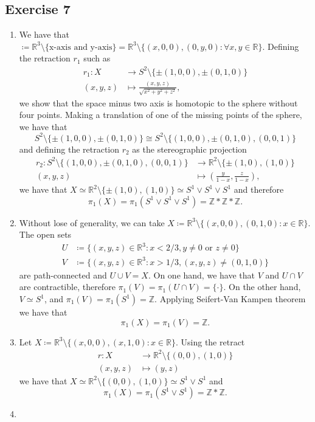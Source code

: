 \documentclass[11pt,a4paper]{article}
\newcommand{\R}{\mathbb R}
\newcommand{\Z}{\mathbb Z}
\begin{document}
\subsection*{Exercise 7}
\renewcommand{\theenumi}{\alph{enumi}} 
\begin{enumerate}
  \item We have that $  \coloneq \mathbb R^3 \setminus \{\text{x-axis and y-axis}\} = \mathbb R^3 \setminus \{(x, 0, 0), (0, y, 0) : \forall x, y \in \mathbb R\} $. Defining the retraction $ r_1 $ such as 
  \begin{align*}
    r_1 \colon X &\to S^2 \setminus \{\pm (1, 0, 0), \pm (0, 1, 0) \} \\
    (x, y, z) &\mapsto \frac{(x, y, z)}{\sqrt{x^2 + y^2 + z^2}},
  \end{align*}
  we show that the space minus two axis is homotopic to the sphere without four points. Making a translation of one of the missing points of the sphere, we have that
  $$
    S^2 \setminus \{\pm (1, 0, 0), \pm (0, 1, 0) \} \cong S^2 \setminus \{(1, 0, 0), \pm (0, 1, 0), (0, 0, 1) \}
  $$
  and defining the retraction $r_2$ as the stereographic projection
  \begin{align*}
    r_2 \colon S^2 \setminus \{(1, 0, 0), \pm (0, 1, 0), (0, 0, 1) \} &\to \mathbb R^2 \setminus \{\pm (1, 0), (1, 0) \} \\
    (x, y, z) &\mapsto \left(\frac{y}{1-x}, \frac{z}{1-x}\right),
  \end{align*}
  we have that
  $
    X \simeq \mathbb R^2 \setminus \{\pm (1, 0), (1, 0) \} \simeq S^1 \vee S^1 \vee S^1 
  $
  and therefore
  $$
    \pi_1 (X) = \pi_1(S^1 \vee S^1 \vee S^1) = \mathbb Z * \mathbb Z * \mathbb Z.
  $$
  
  \item Without lose of generality, we can take $ X \coloneq \R^3 \setminus \{(x, 0, 0), (0, 1, 0) : x \in \R \} $. The open sets 
  \begin{align*}
    U &\coloneq \{(x, y, z) \in \R^3 : x < 2/3, y \neq 0 \text{ or } z \neq 0\} \\
    V &\coloneq \{(x, y, z) \in \R^3 : x > 1/3, (x, y, z) \neq (0, 1, 0) \}
  \end{align*} 
  are path-connected and $ U \cup V = X $. On one hand, we have that $ V $ and $ U \cap V $ are contractible, therefore $ \pi_1(V) = \pi_1(U \cap V) = \{ \cdot \} $. On the other hand, $ V \simeq S^1 $, and $ \pi_1(V) = \pi_1(S^1) = \Z$. Applying Seifert-Van Kampen theorem we have that
  $$
    \pi_1(X) = \pi_1(V) = \Z.
  $$

  \item Let $ X \coloneq \R^3 \setminus \{(x, 0, 0), (x, 1, 0) : x \in \R\} $. Using the retract
  \begin{align*}
    r \colon X &\to \R^2 \setminus \{(0, 0), (1, 0)\} \\
    (x, y, z) &\mapsto (y, z)
  \end{align*}
  we have that $ X \simeq \R^2 \setminus \{(0, 0), (1, 0)\} \simeq S^1 \vee S^1 $ and
  $$
    \pi_1(X) = \pi_1(S^1 \vee S^1) = \mathbb Z * \mathbb Z.
  $$
  
  \item 
\end{enumerate}
\end{document}
